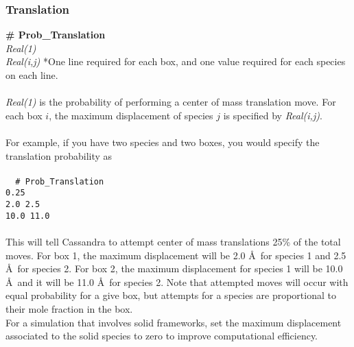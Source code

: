 \subsubsection{Translation}
{\bf \# Prob\_Translation}\\
{\it Real(1)} \\
{\it Real(i,j) } *One line required for each box, and one value required for each species on each line. \\ \\
%
{\it Real(1)} is the probability of performing a center of mass translation move. For each box $i$, the 
maximum displacement of species $j$ is specified by {\it Real(i,j)}.  \\ \\
%
For example, if you have two species and two boxes, you would specify
the translation probability as \\ \\
\texttt{
{ \# Prob\_Translation} \\
 0.25 \\
2.0 2.5\\
10.0 11.0} 
\\ \\
This will tell Cassandra to attempt center of mass translations 25\%
of the total moves. For box 1, the maximum displacement will be 2.0 \AA\ for
species 1 and 2.5 \AA\ for species 2. For box 2, the maximum
displacement for species 1 will be 10.0 \AA\ and it will be 11.0
\AA\ for species 2. Note that attempted moves will occur with equal
probability for a give box, but attempts for a species are
proportional to their mole fraction in the box. \\

For a simulation that involves solid frameworks, set the
maximum displacement associated to the solid species to zero to improve computational efficiency.

